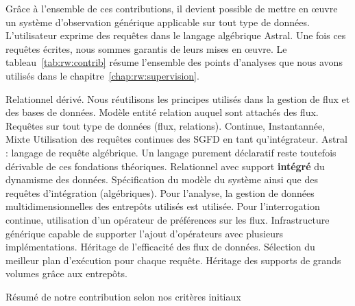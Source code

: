 Grâce à l'ensemble de ces contributions, il devient possible de mettre en œuvre un système d'observation générique applicable sur tout type de données. L'utilisateur exprime des requêtes dans le langage algébrique Astral. Une fois ces requêtes écrites, nous sommes garantis de leurs mises en œuvre. Le tableau~\ref{tab:rw:contrib} résume l'ensemble des points d'analyses que nous avons utilisés dans le chapitre~\ref{chap:rw:supervision}.
\begin{table}[!ht]
\criteretabDonnee
    {Relationnel dérivé. Nous réutilisons les principes utilisés dans la gestion de flux et des bases de données.}
    {\meh Modèle entité relation auquel sont attachés des flux.}
    {\good Requêtes sur tout type de données (flux, relations).}
\criteretabTraitement
    {\good Continue, Instantannée, Mixte}
    {\good Utilisation des requêtes continues des SGFD en tant qu'intégrateur.}
    {\meh Astral : langage de requête algébrique. Un langage purement déclaratif reste toutefois dérivable de ces fondations théoriques.}
    {\good Relationnel avec support \textbf{intégré} du dynamisme des données.}
\criteretabAdaptabilite
    {\good Spécification du modèle du système ainsi que des requêtes d'intégration (algébriques).}
    {\meh Pour l'analyse, la gestion de données multidimensionnelles des entrepôts utilisés est utilisée. Pour l'interrogation continue, utilisation d'un opérateur de préférences sur les flux.}
    {\good Infrastructure générique capable de supporter l'ajout d'opérateurs avec plusieurs implémentations.}
    {\good Héritage de l'efficacité des flux de données. Sélection du meilleur plan d'exécution pour chaque requête. Héritage des supports de grands volumes grâce aux entrepôts.}
\caption{Résumé de notre contribution selon nos critères initiaux}\label{tab:rw:contrib}
\end{table}
